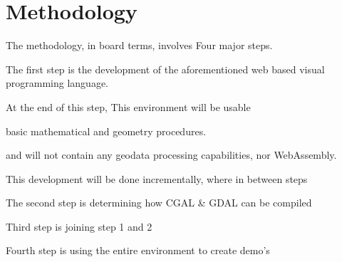 
\section{Methodology}

The methodology, in board terms, involves Four major steps. 

The first step is the development of the aforementioned web based visual programming language. 

At the end of this step, This environment will be usable 

basic mathematical and geometry procedures. 

and will not contain any geodata processing capabilities, nor WebAssembly. 

This development will be done incrementally, where in between steps 



The second step is determining how CGAL \& GDAL can be compiled



Third step is joining step 1 and 2



Fourth step is using the entire environment to create demo's





% 
% 
